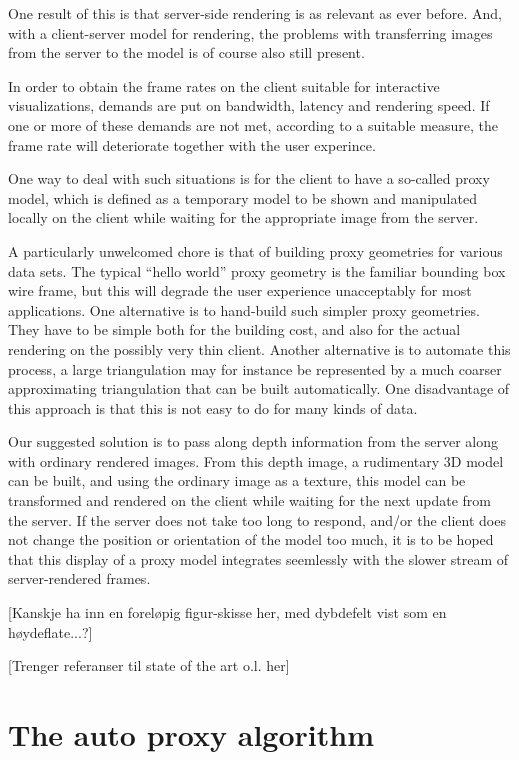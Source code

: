 One result of this is that server-side rendering is as relevant as ever
before. And, with a client-server model for rendering, the problems with
transferring images from the server to the model is of course also still
present.

In order to obtain the frame rates on the client suitable for interactive
visualizations, demands are put on bandwidth, latency and rendering speed. If
one or more of these demands are not met, according to a suitable measure, the
frame rate will deteriorate together with the user experince.

One way to deal with such situations is for the client to have a so-called proxy
model, which is defined as a temporary model to be shown and manipulated locally
on the client while waiting for the appropriate image from the server.

A particularly unwelcomed chore is that of building proxy geometries for various
data sets. The typical ``hello world'' proxy geometry is the familiar bounding
box wire frame, but this will degrade the user experience unacceptably for most
applications. One alternative is to hand-build such simpler proxy
geometries. They have to be simple both for the building cost, and also for the
actual rendering on the possibly very thin client. Another alternative is to
automate this process, a large triangulation may for instance be represented by
a much coarser approximating triangulation that can be built automatically. One
disadvantage of this approach is that this is not easy to do for many kinds of
data. 

Our suggested solution is to pass along depth information from the server along
with ordinary rendered images. From this depth image, a rudimentary 3D model can
be built, and using the ordinary image as a texture, this model can be
transformed and rendered on the client while waiting for the next update from
the server. If the server does not take too long to respond, and/or the client
does not change the position or orientation of the model too much, it is to be
hoped that this display of a proxy model integrates seemlessly with the slower
stream of server-rendered frames.

[Kanskje ha inn en foreløpig figur-skisse her, med dybdefelt vist som en
  høydeflate...?]

[Trenger referanser til state of the art o.l. her]


\section{The auto proxy algorithm}

